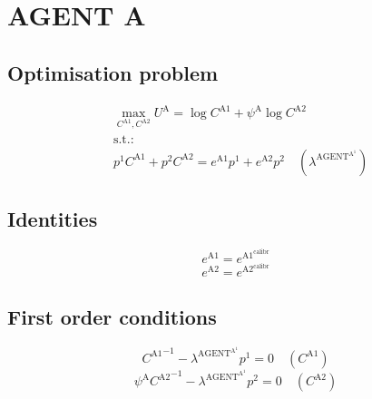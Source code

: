 

\section{AGENT A}

\subsection{Optimisation problem}

\begin{align}
&\max_{C^{\mathrm{A1}}, C^{\mathrm{A2}}
} U^{\mathrm{A}} = \log{C^{\mathrm{A1}}} + {\psi^{\mathrm{A}}} {\log{C^{\mathrm{A2}}}}\\
&\mathrm{s.t.:}\nonumber\\
& {p^{\mathrm{1}}} {C^{\mathrm{A1}}} + {p^{\mathrm{2}}} {C^{\mathrm{A2}}} = {e^{\mathrm{A1}}} {p^{\mathrm{1}}} + {e^{\mathrm{A2}}} {p^{\mathrm{2}}} \quad \left(\lambda^{\mathrm{AGENT}^{\mathrm{A}^{\mathrm{1}}}}\right)
\end{align}


\subsection{Identities}

\begin{equation}
e^{\mathrm{A1}} = e^{\mathrm{A1}^{\mathrm{calibr}}}
\end{equation}
\begin{equation}
e^{\mathrm{A2}} = e^{\mathrm{A2}^{\mathrm{calibr}}}
\end{equation}


\subsection{First order conditions}

\begin{equation}
{C^{\mathrm{A1}}}^{-1} - {\lambda^{\mathrm{AGENT}^{\mathrm{A}^{\mathrm{1}}}}} {p^{\mathrm{1}}} = 0
 \quad \left(C^{\mathrm{A1}}\right)
\end{equation}
\begin{equation}
{\psi^{\mathrm{A}}} {C^{\mathrm{A2}}}^{-1} - {\lambda^{\mathrm{AGENT}^{\mathrm{A}^{\mathrm{1}}}}} {p^{\mathrm{2}}} = 0
 \quad \left(C^{\mathrm{A2}}\right)
\end{equation}




